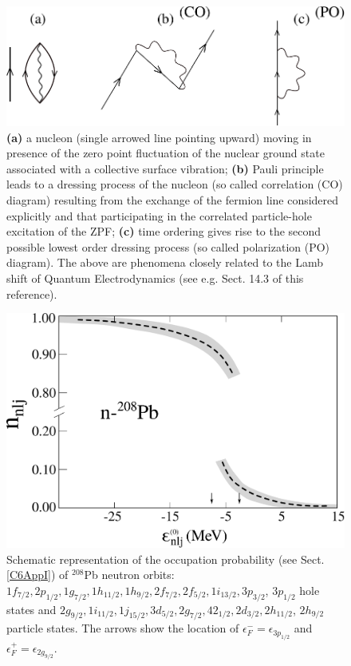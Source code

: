 \begin{figure}
	\centerline {
		\includegraphics*[width=12cm]{introduccion/figs/figpreface8}
	}
	\caption{   \textbf{(a)} a nucleon (single arrowed line pointing upward) moving in presence of the zero point fluctuation of the nuclear ground state associated with a collective surface vibration; \textbf{(b)} Pauli principle leads to a dressing process of the nucleon (so called correlation (CO) diagram) resulting from the exchange of the fermion line considered explicitly and that participating in the correlated particle-hole excitation of the ZPF; \textbf{(c)} time ordering gives rise to the second possible lowest order dressing  process (so called polarization (PO) diagram). The above are phenomena closely related to the Lamb shift of Quantum Electrodynamics (see e.g. \cite{Weinberg:96} Sect. 14.3 of this reference).}
	\label{fig1.0.8}
\end{figure}
\begin{figure}
	\centerline {
		\includegraphics*[width=12cm]{introduccion/figs/fig1_2_5}
	}
	\caption{Schematic representation of the occupation probability (see Sect. \ref{C6AppI}) of $^{208}$Pb neutron orbits: $1f_{7/2},2p_{1/2},1g_{7/2},1h_{11/2},1h_{9/2},2f_{7/2},2f_{5/2},1i_{13/2},3p_{3/2}$,  $3p_{1/2}$ hole states and $2g_{9/2},1i_{11/2},1j_{15/2},3d_{5/2},2g_{7/2},42_{1/2},2d_{3/2},2h_{11/2}$, $2h_{9/2}$ particle states. The arrows show the location of $\epsilon^-_F=\epsilon_{3p_{1/2}}$ and $\epsilon^+_F=\epsilon_{2g_{9/2}}$.}
	\label{fig1.2.5}
\end{figure}
